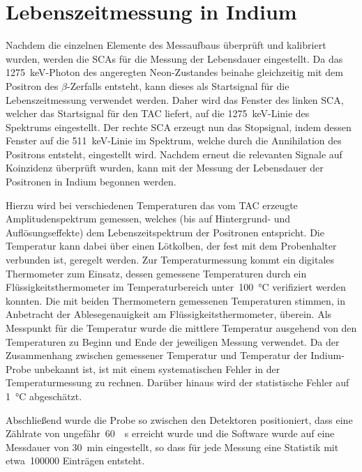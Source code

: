 \documentclass[11pt, a4paper]{article}
\numberwithin{equation}{section}
\begin{document}
\clearpage
\section{Lebenszeitmessung in Indium}
Nachdem die einzelnen Elemente des Messaufbaus überprüft und kalibriert wurden, werden die SCAs für die Messung der Lebensdauer eingestellt.
Da das \SI{1275}{\keV}-Photon des angeregten Neon-Zustandes beinahe gleichzeitig mit dem Positron des $\beta$-Zerfalls entsteht, kann dieses als Startsignal für die Lebenszeitmessung verwendet werden.
Daher wird das Fenster des linken SCA, welcher das Startsignal für den TAC liefert, auf die \SI{1275}{\keV}-Linie des Spektrums eingestellt.
Der rechte SCA erzeugt nun das Stopsignal, indem dessen Fenster auf die \SI{511}{\keV}-Linie im Spektrum, welche durch die Annihilation des Positrons entsteht, eingestellt wird.
Nachdem erneut die relevanten Signale auf Koinzidenz überprüft wurden, kann mit der Messung der Lebensdauer der Positronen in Indium begonnen werden.

Hierzu wird bei verschiedenen Temperaturen das vom TAC erzeugte Amplitudenspektrum gemessen, welches (bis auf Hintergrund- und Auflösungseffekte) dem Lebenszeitspektrum der Positronen entspricht.
Die Temperatur kann dabei über einen Lötkolben, der fest mit dem Probenhalter verbunden ist, geregelt werden.
Zur Temperaturmessung kommt ein digitales Thermometer zum Einsatz, dessen gemessene Temperaturen durch ein Flüssigkeitsthermometer im Temperaturbereich unter~\SI{100}{\degreeCelsius} verifiziert werden konnten.
Die mit beiden Thermometern gemessenen Temperaturen stimmen, in Anbetracht der Ablesegenauigkeit am Flüssigkeitsthermometer, überein.
Als Messpunkt für die Temperatur wurde die mittlere Temperatur ausgehend von den Temperaturen zu Beginn und Ende der jeweiligen Messung verwendet.
Da der Zusammenhang zwischen gemessener Temperatur und Temperatur der Indium-Probe unbekannt ist, ist mit einem systematischen Fehler in der Temperaturmessung zu rechnen.
Darüber hinaus wird der statistische Fehler auf \SI{1}{\degreeCelsius} abgeschätzt.

Abschließend wurde die Probe so zwischen den Detektoren positioniert, dass eine Zählrate von ungefähr~\SI{60}{\per\second} erreicht wurde und die Software wurde auf eine Messdauer von \SI{30}{min} eingestellt, so dass für jede Messung eine Statistik mit etwa~\num{100000} Einträgen entsteht.
\end{document}
